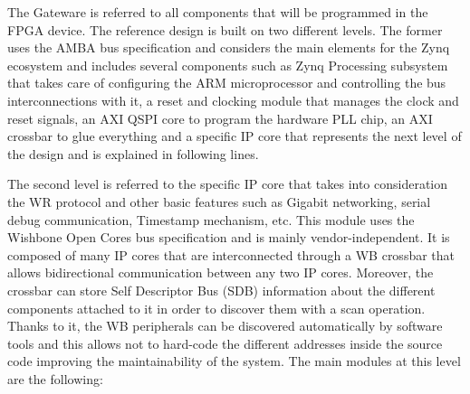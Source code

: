 \documentclass[review]{elsarticle}
\begin{document}
The Gateware is referred to all components that will be programmed in the FPGA device. The reference design is built on two different levels. The former uses the AMBA bus specification and considers the main elements for the Zynq ecosystem and includes several components such as Zynq Processing subsystem that takes care of configuring the ARM microprocessor and controlling the bus interconnections with it, a reset and clocking module that manages the clock and reset signals, an AXI QSPI core to program the hardware PLL chip, an AXI crossbar to glue everything and a specific IP core that represents the next level of the design and is explained in following lines.

The second level is referred to the specific IP core that takes into consideration the WR protocol and other basic features such as Gigabit networking, serial debug communication, Timestamp mechanism, etc. This module uses the Wishbone Open Cores bus specification and is mainly vendor-independent. It is composed of many IP cores that are interconnected through a WB crossbar that allows bidirectional communication between any two IP cores. Moreover, the crossbar can store Self Descriptor Bus (SDB) information about the different components attached to it in order to discover them with a scan operation. Thanks to it, the WB peripherals can be discovered automatically by software tools and this allows not to hard-code the different addresses inside the source code improving the maintainability of the system. The main modules at this level are the following:
\end{document}
